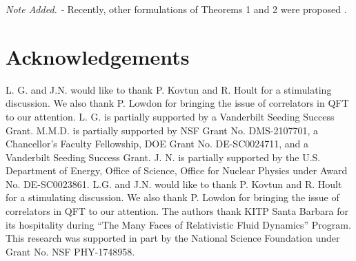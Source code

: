 \documentclass[prl, amsfonts, amssymb, amsmath, nofootinbib,reprint, showkeys, twoside,notitlepage]{revtex4-2}
\theoremstyle{definition}
\theoremstyle{theorem}
\theoremstyle{corollary}
\begin{document}



\textit{Note Added. -} Recently, other formulations of Theorems 1 and 2 were proposed \cite{WangPu2023,HoultKovtunCausality2023}.

\section*{Acknowledgements}
L. G. and J.N. would like to thank P. Kovtun and R. Hoult for a stimulating discussion. We also thank P. Lowdon for bringing the issue of correlators in QFT to our attention. L. G. is partially supported by a Vanderbilt Seeding Success Grant. M.M.D. is partially supported by NSF Grant No. DMS-2107701, a Chancellor’s Faculty Fellowship, DOE Grant No. DE-SC0024711, and a Vanderbilt Seeding Success Grant. J. N. is partially supported by the U.S. Department of Energy, Office of Science, Office for Nuclear Physics under Award No. DE-SC0023861. L.G. and J.N. would like to thank P. Kovtun and R. Hoult for a stimulating discussion. We also thank P. Lowdon for bringing the issue of correlators in QFT to our attention. The authors thank KITP Santa Barbara for its hospitality during “The Many Faces of Relativistic Fluid Dynamics” Program. This research was supported in part by the National Science Foundation under Grant No. NSF PHY-1748958.
\end{document}
